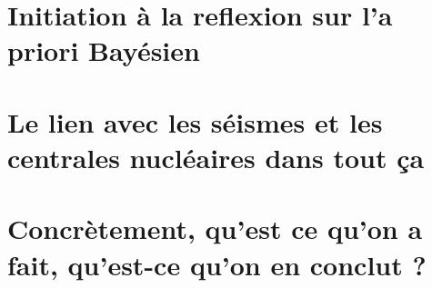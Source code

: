 \documentclass[a4paper]{book}
\renewcommand{\familydefault}{\sfdefault}
\begin{document}


\section*{Initiation à la reflexion sur l'a priori Bayésien}




\section*{Le lien avec les séismes et les centrales nucléaires dans tout ça}



\section*{Concrètement, qu'est ce qu'on a fait, qu'est-ce qu'on en conclut ?}



 

\printbibliography[heading=chapter,title=Bibliography]

\fancyhead{}
\newpage
\pagestyle{empty}
\backmatter
\ \cleardoublepage
\ \newpage
\renewcommand{\familydefault}{\sfdefault}
%
%
%
%
%
\end{document}
